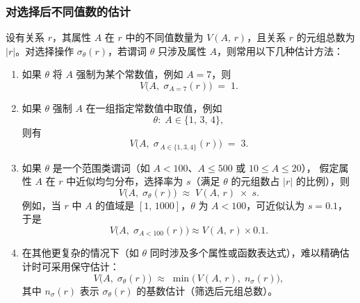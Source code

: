 \subsubsection{对选择后不同值数的估计}
设有关系 $r$，其属性 $A$ 在 $r$ 中的不同值数量为 $V(A,\,r)$，且关系 $r$ 的元组总数为 $\lvert r\rvert$。对选择操作 $\sigma_{\theta}(r)$，若谓词 $\theta$ 只涉及属性 $A$，则常用以下几种估计方法：
\begin{enumerate}
  \item 如果 $\theta$ 将 $A$ 强制为某个常数值，例如 $A=7$，则
    \[
    V\bigl(A,\;\sigma_{A=7}(r)\bigr) \;=\; 1.
    \]
  \item 如果 $\theta$ 强制 $A$ 在一组指定常数值中取值，例如 
    \[
    \theta:\;A \in \{1,\,3,\,4\},
    \]
    则有
    \[
    V\bigl(A,\;\sigma_{\,A\in\{1,3,4\}}(r)\bigr)
    \;=\;
    3.
    \]
  \item 如果 $\theta$ 是一个范围类谓词（如 $A<100$、$A \le 500$ 或 $10 \le A \le 20$），
    假定属性 $A$ 在 $r$ 中近似均匀分布，选择率为 $s$（满足 $\theta$ 的元组数占 $\lvert r\rvert$ 的比例），则
    \[
    V\bigl(A,\;\sigma_{\theta}(r)\bigr)
    \;\approx\;
    V(A,\,r)\;\times\; s.
    \]
    例如，当 $r$ 中 $A$ 的值域是 $[1,\,1000]$，$\theta$ 为 $A<100$，可近似认为 $s=0.1$，于是
    \[
    V\bigl(A,\;\sigma_{A<100}(r)\bigr)\approx V(A,\,r)\times 0.1.
    \]
  \item 在其他更复杂的情况下（如 $\theta$ 同时涉及多个属性或函数表达式），难以精确估计时可采用保守估计：
    \[
    V\bigl(A,\;\sigma_{\theta}(r)\bigr)
    \;\approx\;
    \min\bigl(\,V(A,\,r),\;n_{\sigma}(r)\bigr),
    \]
    其中 $n_{\sigma}(r)$ 表示 $\sigma_{\theta}(r)$ 的基数估计（筛选后元组总数）。
\end{enumerate}

